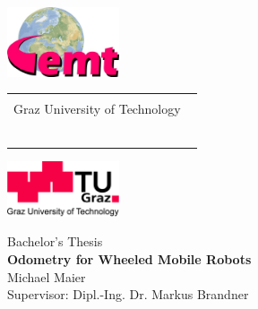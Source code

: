 
\begin{titlepage}

  \begin{center}
    \begin{minipage}[htb]{18cm}
      \hspace*{-2.6cm}
      \includegraphics[width=3.3cm]{./figures/logos/EMT.jpg}
      \begin{tabular}{p{10cm}}\centering{
      \Large Institute of Electrical Measurement and Measurement Signal Processing\\ Graz University of Technology
      ~\\
      ~\\}
      \end{tabular}
      \includegraphics[width=3.3cm]{./figures/logos/TUG.jpg}
    \end{minipage}

    \Large {Bachelor's Thesis\\} %
    \vspace*{1cm} \huge{\textbf{Odometry for Wheeled Mobile Robots}\\}
    \vspace*{1.0cm} 
    \Large{Michael Maier\\} \vspace*{1cm}
    \Large{Supervisor: Dipl.-Ing. Dr. Markus Brandner\\} \vspace*{0.5cm}%



\end{center}
\end{titlepage}
